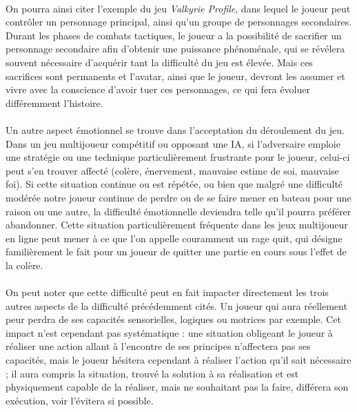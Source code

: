 \paragraph{}On pourra ainsi citer l’exemple du jeu \emph{Valkyrie Profile}, dans lequel le joueur peut contrôler un personnage principal, ainsi qu’un groupe de personnages secondaires. Durant les phases de combats tactiques, le joueur a la possibilité de sacrifier un personnage secondaire afin d’obtenir une puissance phénoménale, qui se révélera souvent nécessaire d’acquérir tant la difficulté du jeu est élevée. Mais ces sacrifices sont permanents et l’avatar, ainsi que le joueur, devront les assumer et vivre avec la conscience d’avoir tuer ces personnages, ce qui fera évoluer différemment l’histoire. \paragraph{}
Un autre aspect émotionnel se trouve dans l’acceptation du déroulement du jeu. Dans un jeu multijoueur compétitif ou opposant une IA, si l’adversaire emploie une stratégie ou une technique particulièrement frustrante pour le joueur, celui-ci peut s’en trouver affecté (colère, énervement, mauvaise estime de soi, mauvaise foi). Si cette situation continue ou est répétée, ou bien que malgré une difficulté modérée notre joueur continue de perdre ou de se faire mener en bateau pour une raison ou une autre, la difficulté émotionnelle deviendra telle qu’il pourra préférer abandonner. Cette situation particulièrement fréquente dans les jeux multijoueur en ligne peut mener à ce que l’on appelle couramment un rage quit, qui désigne familièrement le fait pour un joueur de quitter une partie en cours sous l'effet de la colère.

\paragraph{}On peut noter que cette difficulté peut en fait impacter directement les trois autres aspects de la difficulté précédemment cités. Un joueur qui aura réellement peur perdra de ses capacités sensorielles, logiques ou motrices par exemple. Cet impact n’est cependant pas systématique : une situation obligeant le joueur à réaliser une action allant à l’encontre de ses principes n’affectera pas ses capacités, mais le joueur hésitera cependant à réaliser l’action qu’il sait nécessaire ; il aura compris la situation, trouvé la solution à sa réalisation et est physiquement capable de la réaliser, mais ne souhaitant pas la faire, différera son exécution, voir l’évitera si possible.

